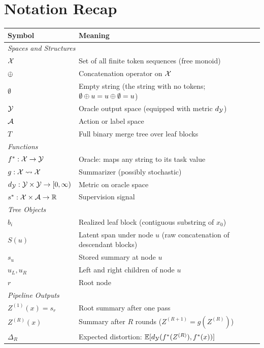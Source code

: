 \section{Notation Recap}\label{app:notation}

\begin{table}[htbp]
\centering\small
\begin{tabular}{ll}
\toprule
Symbol & Meaning \\
\midrule
\multicolumn{2}{l}{\textit{Spaces and Structures}} \\
$\mathcal{X}$ & Set of all finite token sequences (free monoid) \\
$\oplus$ & Concatenation operator on $\mathcal{X}$ \\
$\emptyset$ & Empty string (the string with no tokens; $\emptyset \oplus u = u \oplus \emptyset = u$) \\
$\mathcal{Y}$ & Oracle output space (equipped with metric $d_{\mathcal{Y}}$) \\
$\mathcal{A}$ & Action or label space \\
$T$ & Full binary merge tree over leaf blocks \\
\midrule
\multicolumn{2}{l}{\textit{Functions}} \\
$f^\ast: \mathcal{X} \to \mathcal{Y}$ & Oracle: maps any string to its task value \\
$g: \mathcal{X} \rightsquigarrow \mathcal{X}$ & Summarizer (possibly stochastic) \\
$d_{\mathcal{Y}}: \mathcal{Y} \times \mathcal{Y} \to [0,\infty)$ & Metric on oracle space \\
$s^\ast: \mathcal{X} \times \mathcal{A} \to \mathbb{R}$ & Supervision signal \\
\midrule
\multicolumn{2}{l}{\textit{Tree Objects}} \\
$b_i$ & Realized leaf block (contiguous substring of $x_0$) \\
$S(u)$ & Latent span under node $u$ (raw concatenation of descendant blocks) \\
$s_u$ & Stored summary at node $u$ \\
$u_L, u_R$ & Left and right children of node $u$ \\
$r$ & Root node \\
\midrule
\multicolumn{2}{l}{\textit{Pipeline Outputs}} \\
$Z^{(1)}(x) = s_r$ & Root summary after one pass \\
$Z^{(R)}(x)$ & Summary after $R$ rounds ($Z^{(R+1)} = g(Z^{(R)})$) \\
$\Delta_R$ & Expected distortion: $\mathbb{E}[d_{\mathcal{Y}}(f^\ast(Z^{(R)}), f^\ast(x))]$ \\

\end{tabular}
\end{table}
